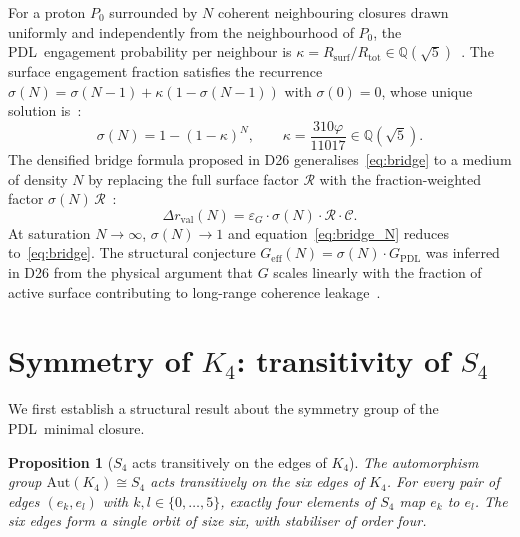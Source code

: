 \documentclass[11pt,a4paper]{article}
\newtheorem{proposition}[theorem]{Proposition}
\theoremstyle{definition}
\newcommand{\PDL}{\textnormal{PDL}}
\newcommand{\Rsurf}{R_{\mathrm{surf}}}
\newcommand{\Rtot}{R_{\mathrm{tot}}}
\newcommand{\epsg}{\varepsilon_G}
\newcommand{\Kfour}{K_4}
\newcommand{\vp}{\varphi}
\newcommand{\kap}{\kappa}
\newcommand{\calC}{\mathcal{C}}
\newcommand{\calR}{\mathcal{R}}
\newcommand{\GPDL}{G_{\mathrm{PDL}}}
\newcommand{\Geff}{G_{\mathrm{eff}}}
\newcommand{\sig}{\sigma}
\newcommand{\drval}{\Delta r_{\mathrm{val}}}
\begin{document}
For a proton $P_0$ surrounded by $N$ coherent neighbouring closures drawn uniformly and independently from the neighbourhood of $P_0$, the \PDL\ engagement probability per neighbour is $\kap = \Rsurf/\Rtot \in \mathbb{Q}(\sqrt{5})$~\cite{Effective_Sigma_PDL_2026}. The surface engagement fraction satisfies the recurrence $\sig(N) = \sig(N-1) + \kap(1-\sig(N-1))$ with $\sig(0) = 0$, whose unique solution is~\cite{Effective_Sigma_PDL_2026}:
\begin{equation}
\sig(N) = 1-(1-\kap)^N, \qquad \kap = \frac{310\vp}{11017} \in \mathbb{Q}(\sqrt{5}).
\label{eq:sigma}
\end{equation}
The densified bridge formula proposed in D26 generalises~\eqref{eq:bridge} to a medium of density $N$ by replacing the full surface factor $\calR$ with the fraction-weighted factor $\sig(N)\,\calR$~\cite{Hubble_PDL_2026}:
\begin{equation}
\drval(N) = \epsg\cdot\sig(N)\cdot\calR\cdot\calC.
\label{eq:bridge_N}
\end{equation}
At saturation $N \to \infty$, $\sig(N) \to 1$ and equation~\eqref{eq:bridge_N} reduces to~\eqref{eq:bridge}. The structural conjecture $\Geff(N) = \sig(N)\cdot\GPDL$ was inferred in D26 from the physical argument that $G$ scales linearly with the fraction of active surface contributing to long-range coherence leakage~\cite{Hubble_PDL_2026}.

\section{Symmetry of \texorpdfstring{$K_4$}{K4}: transitivity of \texorpdfstring{$S_4$}{S4}}
\label{sec:symmetry}

We first establish a structural result about the symmetry group of the \PDL\ minimal closure.

\begin{proposition}[$S_4$ acts transitively on the edges of $\Kfour$]
\label{prop:transitive}
The automorphism group $\mathrm{Aut}(\Kfour) \cong S_4$ acts transitively on the six edges of $\Kfour$. For every pair of edges $(e_k, e_l)$ with $k, l \in \{0,\ldots,5\}$, exactly four elements of $S_4$ map $e_k$ to $e_l$. The six edges form a single orbit of size six, with stabiliser of order four.
\end{proposition}
\end{document}

